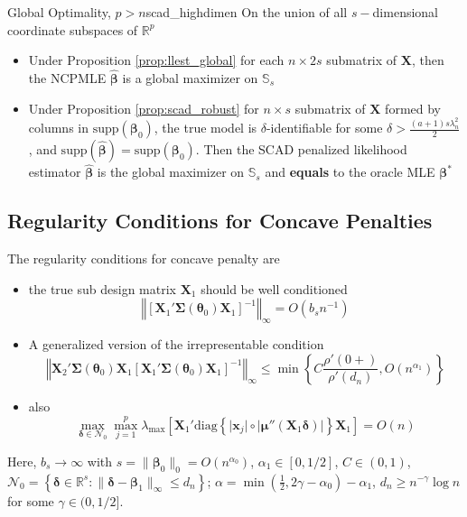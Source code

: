 \documentclass[twoside]{article}
\begin{document}
\begin{proposition}{Global Optimality, $p>n$}{scad_highdimen}
    On the union of all $s-$dimensional coordinate subspaces of $\mathbb{R}^p$
    \begin{itemize}
        \item Under Proposition \ref{prop:llest_global} for each $n\times 2s$ submatrix of $\mathbf{X}$, then the NCPMLE $\hat{\boldsymbol{\beta}}$ is a global maximizer on $\mathbb{S}_s$
        \item Under Proposition \ref{prop:scad_robust} for $n\times s$ submatrix of $\mathbf{X}$ formed by columns in $\mathrm{supp}(\boldsymbol{\beta}_0)$, the true model is $\delta$-identifiable for some $ \delta > \frac{(a+1)s\lambda^2_n}{2} $, and $\mathrm{supp}(\hat{\boldsymbol{\beta}}) = \mathrm{supp}(\boldsymbol{\beta}_0)$. Then the SCAD penalized likelihood estimator $\hat{\boldsymbol{\beta}}$ is the global maximizer on $\mathbb{S}_s$ and \textbf{equals} to the oracle MLE $\boldsymbol{\beta}^*$
    \end{itemize}
\end{proposition}

\subsection{Regularity Conditions for Concave Penalties}
The regularity conditions for concave penalty are
\begin{itemize}
    \item the true sub design matrix $\mathbf{X}_1$ should be well conditioned $$ \left\Vert \left[\mathbf{X}_1'\boldsymbol{\Sigma}(\boldsymbol{\theta}_0)\mathbf{X}_1\right]^{-1} \right\Vert _{\infty} = O(b_sn^{-1})$$
    \item A generalized version of the irrepresentable condition \begin{equation}\label{eq:generalized_ic}
        \left\Vert \mathbf{X}_2' \boldsymbol{\Sigma}(\boldsymbol{\theta}_0) \mathbf{X}_1 \left[\mathbf{X}_1'\boldsymbol{\Sigma}(\boldsymbol{\theta}_0)\mathbf{X}_1\right]^{-1} \right\Vert _{\infty} \leq \min \left\{ C\frac{\rho'(0+)}{\rho'(d_n)}, O(n^{\alpha_1})\right\}
    \end{equation}
    \item also $$\max_{\boldsymbol{\delta}\in\mathcal{N}_0}\max^p_{j=1} \lambda_{\max}\left[ \mathbf{X}_1' \mathrm{diag} \left\{ \lvert \mathbf{x}_j \rvert \circ \lvert \boldsymbol{\mu}''(\mathbf{X}_1\boldsymbol{\delta}) \rvert \right\} \mathbf{X}_1 \right] = O(n)$$
\end{itemize}
Here, $b_s \rightarrow \infty$ with $s=\lVert \boldsymbol{\beta}_0 \rVert _0 = O(n^{\alpha_0})$, $\alpha_1\in [0,1/2]$, $C\in(0,1)$, $\mathcal{N}_0 = \left\{ \boldsymbol{\delta}\in\mathbb{R}^s: \lVert \boldsymbol{\delta}-\boldsymbol{\beta}_1 \rVert _{\infty} \leq d_n \right\}$; $\alpha = \min(\frac{1}{2},2\gamma-\alpha_0)-\alpha_1$, $d_n\geq n^{-\gamma}\log n $ for some $\gamma \in (0, 1/2]$.
\end{document}
